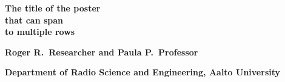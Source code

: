 \documentclass[portrait,a1,final]{a0poster} %
\begin{document}
\thispagestyle{empty} %




\begin{minipage}[t]{0.98\linewidth} %
\vspace{0pt} %

\vspace{0.008\linewidth} %

\begin{minipage}[t]{0.28\linewidth} %
\vspace{0pt} %


\end{minipage} %
\begin{minipage}[t]{0.7\linewidth} %
\vspace{0pt} %





{\renewcommand{\baselinestretch}{0.85} %
\Huge{\bfseries{\textsf{The title of the poster\\ that can span\\ to multiple rows}}} %
\par} %


\vspace{0.04\linewidth} %

\normalsize{\textsf{\bfseries{Roger R.\ Researcher and Paula P.\ Professor}}} %

\textcolor{aaltoGray}{\textsf{\bfseries{Department of Radio Science and Engineering, Aalto University}}}
%
\end{minipage}
\end{minipage}
\end{document}
